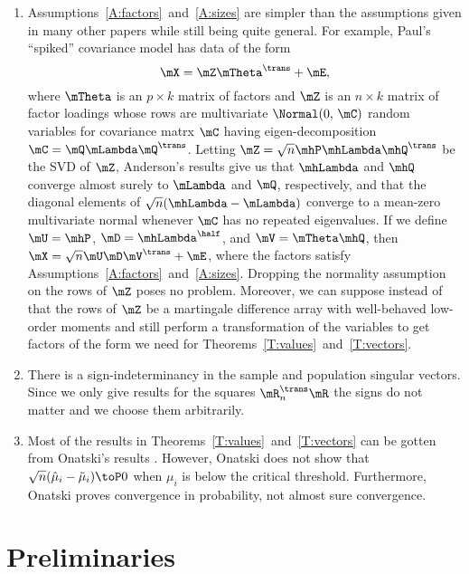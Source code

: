 \begin{enumerate}
    
\item
Assumptions~\ref{A:factors}~and~\ref{A:sizes} are simpler than the assumptions given in many other papers while still being quite general.  For example, Paul's ``spiked'' covariance model has data of the form
\[
    \mX = \mZ \mTheta^\trans + \mE,
\]
where $\mTheta$ is an $p \times k$ matrix of factors and $\mZ$ is an $n\times k$ matrix of factor loadings whose rows are \iid multivariate $\Normal(0,\, \mC)$ random variables for covariance matrx $\mC$ having eigen-decomposition $\mC = \mQ \mLambda \mQ^\trans$.  Letting $\mZ = \sqrt{n} \mhP \mhLambda \mhQ^\trans$ be the SVD of $\mZ$, Anderson's results \cite{anderson1963atp} give us that $\mhLambda$ and $\mhQ$ converge almost surely to $\mLambda$ and $\mQ$, respectively, and that the diagonal elements of $\sqrt{n} (\mhLambda - \mLambda)$ converge to a mean-zero multivariate normal whenever $\mC$ has no repeated eigenvalues.  If we define $\mU = \mhP$, $\mD = \mhLambda^\half$, and $\mV = \mTheta \mhQ$, then $\mX = \sqrt{n} \mU \mD \mV^\trans + \mE$, where the factors satisfy Assumptions~\ref{A:factors}~and~\ref{A:sizes}.  Dropping the normality assumption on the rows of $\mZ$ poses no problem.  Moreover, we can suppose instead of \iid that the rows of $\mZ$ be a martingale difference array with well-behaved low-order moments and still perform a transformation of the variables to get factors of the form we need for Theorems~\ref{T:values}~and~\ref{T:vectors}.

\item
There is a sign-indeterminancy in the sample and population singular vectors. Since we only give results for the squares $\mR_n^\trans \mR$ the signs do not matter and we choose them arbitrarily.

\item 
Most of the results in Theorems~\ref{T:values}~and~\ref{T:vectors} can be gotten from Onatski's results \cite{onatski2009}.   However, Onatski does not show that $\sqrt{n} (\hat \mu_i - \tilde \mu_i) \toP 0$ when $\mu_i$ is below the critical threshold.  Furthermore, Onatski proves convergence in probability, not almost sure convergence.

\end{enumerate}

\section{Preliminaries}\label{S:lowrank-preliminaries}

